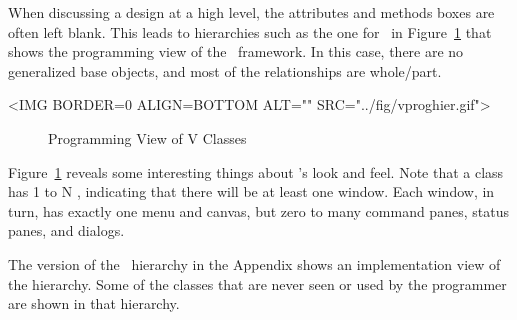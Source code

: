 When discussing a design at a high level, the attributes and
methods boxes are often left blank. This leads to hierarchies
such as the one for \V\ in Figure~\ref{fig:vproghier} that shows
the programming view of the \V\ framework. In this case, there
are no generalized base objects, and most of the relationships
are whole/part.

\begin{rawhtml}
<IMG BORDER=0 ALIGN=BOTTOM ALT="" SRC="../fig/vproghier.gif">
\end{rawhtml}

\begin{figure}[htb]
\begin{center}
\small
\begin{latexonly}

\end{latexonly}
\normalfont\normalsize
\end{center}
\caption{Programming View of V Classes} \label{fig:vproghier}
\end{figure}

Figure~\ref{fig:vproghier} reveals some interesting things about
\V's look and feel. Note that a  class has 1 to N
, indicating that there will be at least one
window. Each window, in turn, has exactly one menu and canvas,
but zero to many command panes, status panes, and dialogs.

The version of the \V\ hierarchy in the Appendix shows an
implementation view of the hierarchy. Some of the classes that
are never seen or used by the programmer are shown in that
hierarchy. 
